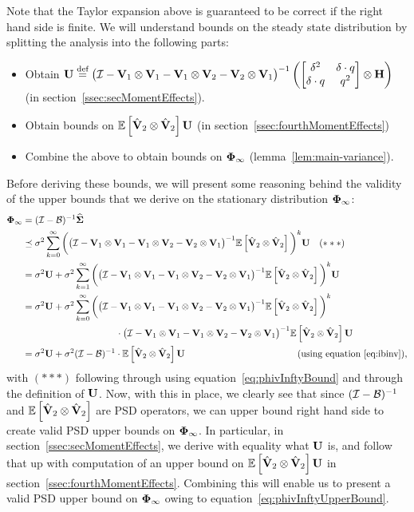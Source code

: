 Note that the Taylor expansion above is guaranteed to be correct if the right hand side is finite. We will understand bounds on the steady state distribution by splitting the analysis into the following parts:
\begin{itemize}
\item Obtain $\mathbf{U}\stackrel{\textrm{def}}{=}\big(\mathcal{I}-\mathbf{V}_1\otimes\mathbf{V}_1 - \mathbf{V}_1\otimes\mathbf{V}_2 - \mathbf{V}_2\otimes\mathbf{V}_1\big)^{-1} \left(\begin{bmatrix}\delta^2&\delta\cdot q\\\delta\cdot q&q^2\end{bmatrix}\otimes\mathbf{H}\right)$ (in section~\ref{ssec:secMomentEffects}).
\item Obtain bounds on $\mathbb{E}\left[\hat{\mathbf{V}}_2\otimes\hat{\mathbf{V}}_2\right]\mathbf{U}$ (in section~\ref{ssec:fourthMomentEffects})
\item Combine the above to obtain bounds on $\boldsymbol{\Phi}_{\infty}$ (lemma~\ref{lem:main-variance}).
\end{itemize}
Before deriving these bounds, we will present some reasoning behind the validity of the upper bounds that we derive on the stationary distribution $\boldsymbol{\Phi}_{\infty}$:
\begin{align}
\label{eq:phivInftyUpperBound}
\boldsymbol{\Phi}_\infty&=(\mathcal{I}-\mathcal{B})^{-1}\mathbf{\widehat{\Sigma}}\nonumber\\
&\preceq\sigma^2 \sum_{k=0}^{\infty}\bigg(\big(\mathcal{I}-\mathbf{V}_1\otimes\mathbf{V}_1 - \mathbf{V}_1\otimes\mathbf{V}_2 - \mathbf{V}_2\otimes\mathbf{V}_1\big)^{-1}\mathbb{E}\left[\hat{\mathbf{V}}_2\otimes\hat{\mathbf{V}}_2\right]\bigg)^k\mathbf{U}\quad(***)\nonumber\\
&=\sigma^2\mathbf{U}+\sigma^2\sum_{k=1}^{\infty}\bigg(\big(\mathcal{I}-\mathbf{V}_1\otimes\mathbf{V}_1 - \mathbf{V}_1\otimes\mathbf{V}_2 - \mathbf{V}_2\otimes\mathbf{V}_1\big)^{-1}\mathbb{E}\left[\hat{\mathbf{V}}_2\otimes\hat{\mathbf{V}}_2\right]\bigg)^k\mathbf{U}\nonumber\\
&=\sigma^2\mathbf{U}+\sigma^2\sum_{k=0}^{\infty}\bigg(\big(\mathcal{I}-\mathbf{V}_1\otimes\mathbf{V}_1 - \mathbf{V}_1\otimes\mathbf{V}_2 - \mathbf{V}_2\otimes\mathbf{V}_1\big)^{-1}\mathbb{E}\left[\hat{\mathbf{V}}_2\otimes\hat{\mathbf{V}}_2\right]\bigg)^k\nonumber\\
&\qquad\qquad\qquad\qquad\qquad\cdot\big(\mathcal{I}-\mathbf{V}_1\otimes\mathbf{V}_1 - \mathbf{V}_1\otimes\mathbf{V}_2 - \mathbf{V}_2\otimes\mathbf{V}_1\big)^{-1}\mathbb{E}\left[\hat{\mathbf{V}}_2\otimes\hat{\mathbf{V}}_2\right]\mathbf{U}\nonumber\\
&=\sigma^2\mathbf{U}+\sigma^2(\mathcal{I}-\mathcal{B})^{-1}\cdot\mathbb{E}\left[\hat{\mathbf{V}}_2\otimes\hat{\mathbf{V}}_2\right]\mathbf{U}\qquad\qquad\qquad\qquad\qquad\qquad(\text{using equation}~\ref{eq:ibinv}),
\end{align}
with $(***)$ following through using equation~\ref{eq:phivInftyBound} and through the definition of $\mathbf{U}$.
Now, with this in place, we clearly see that since $(\mathcal{I}-\mathcal{B})^{-1}$ and $\mathbb{E}\left[\hat{\mathbf{V}}_2\otimes\hat{\mathbf{V}}_2\right]$ are PSD operators, we can upper bound right hand side to create valid PSD upper bounds on $\boldsymbol{\Phi}_{\infty}$. In particular, in section~\ref{ssec:secMomentEffects}, we derive with equality what $\mathbf{U}$ is, and follow that up with computation of an upper bound on $\mathbb{E}\left[\hat{\mathbf{V}}_2\otimes\hat{\mathbf{V}}_2\right]\mathbf{U}$ in section~\ref{ssec:fourthMomentEffects}. Combining this will enable us to present a valid PSD upper bound on $\boldsymbol{\Phi}_{\infty}$ owing to equation~\ref{eq:phivInftyUpperBound}.

